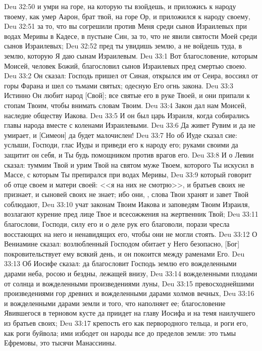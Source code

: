 \vs Deu 32:50 и умри на горе, на которую ты взойдешь, и приложись к народу твоему, как умер Аарон, брат твой, на горе Ор, и приложился к народу своему,
\vs Deu 32:51 за то, что вы согрешили против Меня среди сынов Израилевых при водах Меривы в Кадесе, в пустыне Син, за то, что не явили святости Моей среди сынов Израилевых;
\vs Deu 32:52 пред  ты увидишь землю, а не войдешь туда, в землю, которую Я даю сынам Израилевым.
\vs Deu 33:1 Вот благословение, которым Моисей, человек Божий, благословил сынов Израилевых пред смертью своею.
\vs Deu 33:2 Он сказал: Господь пришел от Синая, открылся им от Сеира, воссиял от горы Фарана и шел со тьмами святых; одесную Его огнь закона.
\vs Deu 33:3 Истинно Он любит народ [Свой]; все святые его в руке Твоей, и они припали к стопам Твоим, чтобы внимать словам Твоим.
\vs Deu 33:4 Закон дал нам Моисей, наследие обществу Иакова.
\vs Deu 33:5 И он был царь Израиля, когда собирались главы народа вместе с коленами Израилевыми.
\vs Deu 33:6 Да живет Рувим и да не умирает, и [Симеон] да  будет малочислен!
\vs Deu 33:7 Но об Иуде сказал сие: услыши, Господи, глас Иуды и приведи его к народу его; руками своими да защитит он себя, и Ты будь помощником против врагов его.
\vs Deu 33:8 И о Левии сказал: туммим Твой и урим Твой на святом муже Твоем, которого Ты искусил в Массе, с которым Ты препирался при водах Меривы,
\vs Deu 33:9 который говорит об отце своем и матери своей: <<я на них не смотрю>>, и братьев своих не признает, и сыновей своих не знает; ибо они, , слова Твои хранят и завет Твой соблюдают,
\vs Deu 33:10 учат законам Твоим Иакова и заповедям Твоим Израиля, возлагают курение пред лице Твое и всесожжения на жертвенник Твой;
\vs Deu 33:11 благослови, Господи, силу его и о деле рук его благоволи, порази чресла восстающих на него и ненавидящих его, чтобы они не могли стоять.
\vs Deu 33:12 О Вениамине сказал: возлюбленный Господом обитает у Него безопасно, [Бог] покровительствует ему всякий день, и он покоится между раменами Его.
\vs Deu 33:13 Об Иосифе сказал: да благословит Господь землю его вожделенными дарами неба, росою и  бездны, лежащей внизу,
\vs Deu 33:14 вожделенными плодами от солнца и вожделенными произведениями луны,
\vs Deu 33:15 превосходнейшими произведениями гор древних и вожделенными дарами холмов вечных,
\vs Deu 33:16 и вожделенными дарами земли и того, что наполняет ее; благословение Явившегося в терновом кусте да приидет на главу Иосифа и на темя наилучшего из братьев своих;
\vs Deu 33:17 крепость его как первородного тельца, и роги его, как роги буйвола; ими избодет он народы все до пределов земли: это тьмы Ефремовы, это тысячи Манассиины.
